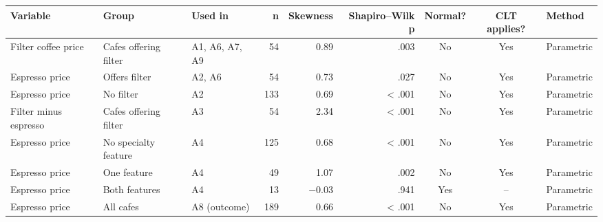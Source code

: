 \begin{tabular}{lllrrrccl}
\toprule
Variable & Group & Used in & n & Skewness & Shapiro--Wilk p & Normal? & CLT applies? & Method \\
\midrule
Filter coffee price & Cafes offering filter & A1, A6, A7, A9 &  54 & 0.89 & .003 & No & Yes & Parametric \\
Espresso price & Offers filter & A2, A6 &  54 & 0.73 & .027 & No & Yes & Parametric \\
Espresso price & No filter & A2 & 133 & 0.69 & < .001 & No & Yes & Parametric \\
Filter minus espresso & Cafes offering filter & A3 &  54 & 2.34 & < .001 & No & Yes & Parametric \\
Espresso price & No specialty feature & A4 & 125 & 0.68 & < .001 & No & Yes & Parametric \\
Espresso price & One feature & A4 &  49 & 1.07 & .002 & No & Yes & Parametric \\
Espresso price & Both features & A4 &  13 & \ensuremath{-}0.03 & .941 & Yes & -- & Parametric \\
Espresso price & All cafes & A8 (outcome) & 189 & 0.66 & < .001 & No & Yes & Parametric \\
\bottomrule
\end{tabular}

